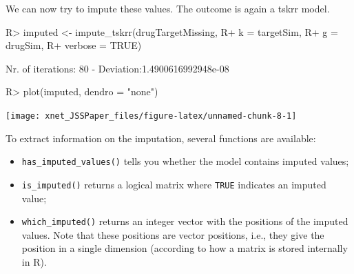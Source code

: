 \documentclass[
]{article}
\providecommand{\tightlist}{%
  \setlength{\itemsep}{0pt}\setlength{\parskip}{0pt}}
\begin{document}
We can now try to impute these values. The outcome is again a tskrr
model.

\begin{CodeChunk}

\begin{CodeInput}
R> imputed <- impute_tskrr(drugTargetMissing,
R+                         k = targetSim,
R+                         g = drugSim,
R+                         verbose = TRUE)
\end{CodeInput}

\begin{CodeOutput}
Nr. of iterations: 80 - Deviation:1.4900616992948e-08
\end{CodeOutput}

\begin{CodeInput}
R> plot(imputed, dendro = "none")
\end{CodeInput}


\begin{center}\texttt{[image: xnet\_JSSPaper\_files/figure-latex/unnamed-chunk-8-1]} \end{center}

\end{CodeChunk}

To extract information on the imputation, several functions are
available:

\begin{itemize}
\tightlist
\item
  \texttt{has\_imputed\_values()} tells you whether the model contains
  imputed values;
\item
  \texttt{is\_imputed()} returns a logical matrix where \texttt{TRUE}
  indicates an imputed value;
\item
  \texttt{which\_imputed()} returns an integer vector with the positions
  of the imputed values. Note that these positions are vector positions,
  i.e., they give the position in a single dimension (according to how a
  matrix is stored internally in R).
\end{itemize}
\end{document}
